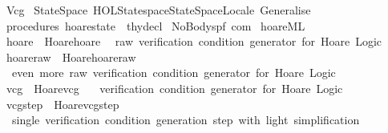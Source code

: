 %
\begin{isabellebody}%
%
%
\isamarkuptrue%
%
\isadelimtheory
%
\endisadelimtheory
%
\isatagtheory
{}\isamarkupfalse%
\ Vcg\isanewline
{}\ StateSpace\ {\isachardoublequoteopen}HOL{\isacharminus}Statespace{\isachardot}StateSpaceLocale{\isachardoublequoteclose}\ Generalise\isanewline
{}\ {\isachardoublequoteopen}procedures{\isachardoublequoteclose}\ {\isachardoublequoteopen}hoarestate{\isachardoublequoteclose}\ {\isacharcolon}{\isacharcolon}\ thy{\isacharunderscore}decl\isanewline
{}%
\endisatagtheory
{\isafoldtheory}%
%
\isadelimtheory
%
\endisadelimtheory
\isanewline
\isanewline
{}\isamarkupfalse%
\ NoBody{\isacharcolon}{\isacharcolon}{\isachardoublequoteopen}{\isacharparenleft}{\isacharprime}s{\isacharcomma}{\isacharprime}p{\isacharcomma}{\isacharprime}f{\isacharparenright}\ com{\isachardoublequoteclose}\isanewline
%
\isadelimML
\isanewline
%
\endisadelimML
%
\isatagML
{}\isamarkupfalse%
\ {\isachardoublequoteopen}hoare{\isachardot}ML{\isachardoublequoteclose}\isanewline
\isanewline
{}\isamarkupfalse%
\ hoare\ {\isacharequal}\ {\isachardoublequoteopen}Hoare{\isachardot}hoare{\isachardoublequoteclose}\isanewline
\ \ {\isachardoublequoteopen}raw\ verification\ condition\ generator\ for\ Hoare\ Logic{\isachardoublequoteclose}\isanewline
\isanewline
{}\isamarkupfalse%
\ hoare{\isacharunderscore}raw\ {\isacharequal}\ {\isachardoublequoteopen}Hoare{\isachardot}hoare{\isacharunderscore}raw{\isachardoublequoteclose}\isanewline
\ \ {\isachardoublequoteopen}even\ more\ raw\ verification\ condition\ generator\ for\ Hoare\ Logic{\isachardoublequoteclose}\isanewline
\isanewline
{}\isamarkupfalse%
\ vcg\ {\isacharequal}\ {\isachardoublequoteopen}Hoare{\isachardot}vcg{\isachardoublequoteclose}\ \isanewline
\ \ {\isachardoublequoteopen}verification\ condition\ generator\ for\ Hoare\ Logic{\isachardoublequoteclose}\isanewline
\isanewline
{}\isamarkupfalse%
\ vcg{\isacharunderscore}step\ {\isacharequal}\ {\isachardoublequoteopen}Hoare{\isachardot}vcg{\isacharunderscore}step{\isachardoublequoteclose}\ \isanewline
\ \ {\isachardoublequoteopen}single\ verification\ condition\ generation\ step\ with\ light\ simplification{\isachardoublequoteclose}\isanewline
\isanewline

\end{isabellebody}
